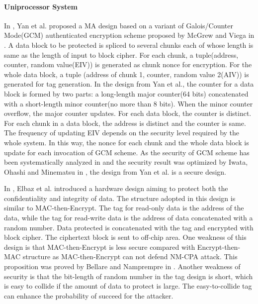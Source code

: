 \documentclass{article}
\begin{document}
\paragraph{Uniprocessor System}
In \cite{yan-MA}, Yan et al. proposed a MA design based on a variant of Galois/Counter Mode(GCM) authenticated encryption scheme proposed by McGrew and Viega in \cite{gcm}. A data block to be protected is spliced to several chunks each of whose length is same as the length of input to block cipher. For each chunk, a tuple(address, counter, random value(EIV)) is generated as chunk nonce for encryption. For the whole data block, a tuple (address of chunk 1, counter, random value 2(AIV)) is generated for tag generation. 
In the design from Yan et al., the counter for a data block is formed by two parts: a long-length major counter(64 bits) concatenated with a short-length minor counter(no more than 8 bits). When the minor counter overflow, the major counter updates. For each data block, the counter is distinct. For each chunk in a data block, the address is distinct and the counter is same. The frequency of updating EIV depends on the security level required by the whole system.  In this way, the nonce for each chunk and the whole data block is update for each invocation of GCM scheme. As the security of GCM scheme has been systematically analyzed in \cite{gcm} and the security result was optimized by Iwata, Ohashi and Minematsu in \cite{breaking}, the design from Yan et al. is a secure design.


In \cite{pc-ice}, Elbaz et al. introduced a hardware design aiming to protect both the confidentiality and integrity of data. The structure adopted in this design is similar to MAC-then-Encrypt. The tag for read-only data is the address of the data, while the tag for read-write data is the address of data concatenated with a random number. Data protected is concatenated with the tag and encrypted with block cipher. The ciphertext block is sent to off-chip area.
One weakness of this design is that MAC-then-Encrypt is less secure compared with Encrypt-then-MAC structure as MAC-then-Encrypt can not defend NM-CPA attack. This proposition was proved by Bellare and Namprempre in \cite{ae-notion}.
Another weakness of security is that the bit-length of random number in the tag design is short, which is easy to collide if the amount of data to protect is large. The easy-to-collide tag can enhance the probability of succeed for the attacker.
\end{document}

